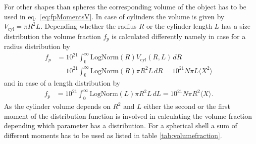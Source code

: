 For other shapes than spheres the corresponding volume of the object has to be used in eq.\ \ref{eq:fpMomentsV}.
In case of cylinders the volume is given by $V_\text{cyl}=\pi R^2 L$. Depending whether the radius $R$ or the
cylinder length $L$ has a size distribution the volume fraction $f_p$ is calculated differently namely
in case for a radius distribution by
\begin{align}
f_p &= 10^{21} \int_0^\infty \mathrm{LogNorm}(R) V_\text{cyl}(R,L) \, dR \label{eq:fpMomentsA} \\
    &= 10^{21} \int_0^\infty \mathrm{LogNorm}(R) \pi R^2L \, dR = 10^{21} N \pi L \langle X^2 \rangle
\end{align}
and in case of a length distribution by
\begin{align}
f_p %
    &= 10^{21} \int_0^\infty \mathrm{LogNorm}(L) \pi R^2L \, dL = 10^{21} N \pi R^2 \langle X \rangle .
\end{align}
As the cylinder volume depends on $R^2$  and $L$ either the second or the first moment of the distribution
function is involved in calculating the volume fraction depending which parameter has a distribution.
For a spherical shell a sum of different moments has to be used as listed in table \ref{tab:volumefraction}.

